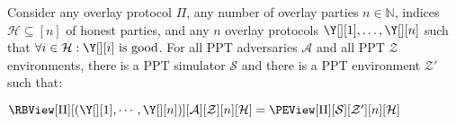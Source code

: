 %
%


\begin{conjecture}[Simulation]
  Consider any overlay protocol $\Pi$, any number of overlay parties $n \in \mathbb{N}$,
  indices $\mathcal{H} \subseteq [n]$ of honest parties,
  and any $n$ overlay protocols $\Y[][1], \ldots, \Y[][n]$
  such that $\forall i \in \mathcal{H}: \Y[][i] \text{ is good}$.
  For all PPT adversaries $\mathcal{A}$ and all PPT $\mathcal{Z}$ environments,
  there is a PPT simulator $\mathcal{S}$ and there is a PPT environment $\mathcal{Z}'$ such that:

  $\RBView[\Pi][({\Y[][1]}, \cdots, {\Y[][n]})][\mathcal{A}][\mathcal{Z}][n][\mathcal{H}]
   =
   \PEView[\Pi][\mathcal{S}][\mathcal{Z}'][n][\mathcal{H}]$
\end{conjecture}
